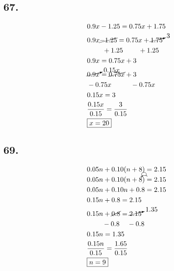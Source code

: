 \documentclass{article}
\newcommand{\tikzmark}[1]{\tikz[overlay,remember picture] \node (#1) {};}
\newcommand{\DrawBox}[2]{%
    \begin{tikzpicture}[overlay,remember picture]
        \draw[->,shorten >=5pt,shorten <=5pt,out=70,in=130,distance=0.5cm,#1] (MarkA.north) to (MarkC.north);
        \draw[->,shorten >=5pt,shorten <=5pt,out=50,in=140,distance=0.3cm,#2] (MarkA.north) to (MarkB.north);
    \end{tikzpicture}
}
\begin{document}
    \subsection*{67.}
    \begin{align*}
        & 0.9x - 1.25 = 0.75x + 1.75\\
        & 0.9x \cancel{- 1.25} = 0.75x + \cancelto{3}{1.75}\\
        & \hspace{.8cm} + 1.25 \hspace{.8cm} + 1.25\\
        & 0.9x = 0.75x + 3\\
        & \cancelto{0.15x}{0.9x} = \cancel{0.75x} + 3\\
        & -0.75x \hspace{1cm} - 0.75x\\
        & 0.15x = 3\\
        & \frac{0.15x}{0.15} = \frac{3}{0.15} \\
        & \boxed{x = 20} \\
    \end{align*}

    \subsection*{69.}
    \begin{align*}
        & 0.05n + 0.10(n+8) = 2.15\\
        & 0.05n + \tikzmark{MarkA}0.10(n\tikzmark{MarkB}+8\tikzmark{MarkC})\DrawBox{black}{black} = 2.15\\
        & 0.05n + 0.10n + 0.8 = 2.15\\
        & 0.15n + 0.8 = 2.15 \\
        & 0.15n + \cancel{0.8} = \cancelto{1.35}{2.15}\\
        & \hspace{.8cm} - 0.8 \hspace{.4cm} - 0.8\\
        & 0.15n = 1.35\\
        & \frac{0.15n}{0.15} = \frac{1.65}{0.15} \\
        & \boxed{n = 9} \\
    \end{align*}
\end{document}
